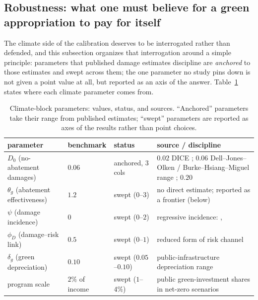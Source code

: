 \documentclass[12pt]{article}
\begin{document}
\subsection{Robustness: what one must believe for a green appropriation to
pay for itself}
\label{subsec:robustness}

The climate side of the calibration deserves to be interrogated rather than
defended, and this subsection organizes that interrogation around a simple
principle: parameters that published damage estimates discipline are
\emph{anchored} to those estimates and swept across them; the one parameter
no study pins down is not given a point value at all, but reported as an
axis of the answer. Table~\ref{tab:sources} states where each climate
parameter comes from.

\begin{table}[!htb]
\centering\small
\caption{Climate-block parameters: values, status, and sources. ``Anchored''
parameters take their range from published estimates; ``swept'' parameters
are reported as axes of the results rather than point choices.}
\label{tab:sources}
\footnotesize
\setlength{\tabcolsep}{4pt}
\begin{tabular}{lll p{}}
\toprule
parameter & benchmark & status & source / discipline \\
\midrule
$D_0$ (no-abatement damages) & $0.06$ & anchored, 3 cols &
  $0.02$ DICE \citep{nordhaus2017}; $0.06$ Dell--Jones--Olken /
  Burke--Hsiang--Miguel range \citep{hsiang2017,carleton2022};
  $0.20$ \citet{bilalkanzig2024} \\
$\theta_g$ (abatement effectiveness) & $1.2$ & swept ($0$--$3$) &
  no direct estimate; reported as a frontier (below) \\
$\psi$ (damage incidence) & $0$ & swept ($0$--$2$) &
  regressive incidence: \citet{kanzig2023carbon}, \citet{fried2018} \\
$\phi_D$ (damage--risk link) & $0.5$ & swept ($0$--$1$) &
  reduced form of \citet{acharya2023optimal} risk channel \\
$\delta_g$ (green depreciation) & $0.10$ & swept ($0.05$--$0.10$) &
  public-infrastructure depreciation range \\
program scale & $2\%$ of income & swept ($1$--$4\%$) &
  public green-investment shares in net-zero scenarios \\
\bottomrule
\end{tabular}
\end{table}
\end{document}
